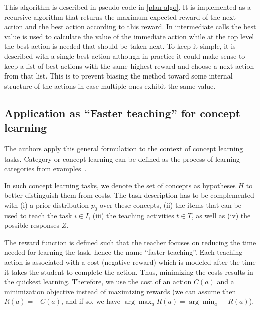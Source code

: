 This algorithm is described in pseudo-code in \autoref{plan-algo}.
It is implemented as a recursive algorithm that returns the maximum expected reward of the next action and the best action according to this reward.
In intermediate calls the best value is used to calculate the value of the immediate action while at the top level the best action is needed that should be taken next.
To keep it simple, it is described with a single best action although in practice it could make sense to keep a list of best actions with the same highest reward and choose a next action from that list. This is to prevent biasing the method toward some internal structure of the actions in case multiple ones exhibit the same value.

\subsection{Application as ``Faster teaching'' for concept learning}
\label{sec:concept-learning}

The authors apply this general formulation to the context of concept learning tasks.
Category or concept learning can be defined as the process of learning categories from examples~\cite{feldman2003simplicity}.

In such concept learning tasks, we denote the set of concepts as hypotheses $H$ to better distinguish them from costs. 
The task description has to be complemented with (i) a prior distribution $p_0$ over these concepts, (ii) the items that can be used to teach the task $i \in I$, (iii) the teaching activities $t \in T$, as well as (iv) the possible responses $Z$.



The reward function is defined such that the teacher focuses on reducing the time needed for learning the task, hence the name ``faster teaching''. 
Each teaching action is associated with a cost (negative reward) which is modeled after the time it takes the student to complete the action. 
Thus, minimizing the costs results in the quickest learning. 
Therefore, we use the cost of an action $C(a)$ and a minimization objective instead of maximizing rewards (we can assume then $R(a) = -C(a)$, and if so, we have $\arg \max_a R(a) = \arg \min_a -R(a)$).

